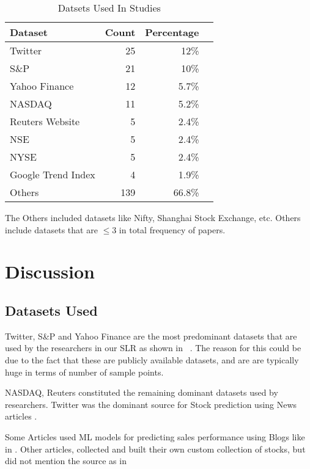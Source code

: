 \documentclass[11pt]{article}
\begin{document}
\begin{table}
\caption{Datsets Used In Studies}
\label{T:datasetsused}
\begin{tabularx}{\columnwidth}{X r r r}
\toprule
Dataset  & Count & Percentage \\
\midrule
Twitter & 25 & 12\% \\
S\&P  & 21 & 10\% \\
Yahoo Finance & 12 & 5.7\% \\
NASDAQ & 11 & 5.2\%\\
Reuters Website & 5 & 2.4\% \\
NSE & 5 & 2.4\%\\
NYSE & 5 & 2.4\% \\
Google Trend Index & 4 & 1.9\%\\
Others & 139 & 66.8\% \\

\midrule
\end{tabularx}
\end{table}

The Others included datasets like Nifty, Shanghai Stock Exchange, etc. Others include datasets that are $\le 3$ in total frequency of papers.

\section{Discussion} \label{S:discussion}

\subsection{Datasets Used} \label{S:datasets used}

Twitter, S\&P and Yahoo Finance are the most predominant datasets that are used by the researchers in our SLR as shown in ~. The reason for this could be due to the fact that these are publicly available datasets, and are are typically huge in terms of number of sample points. 

NASDAQ, Reuters constituted the remaining dominant datasets used by researchers. Twitter was the dominant source for Stock prediction using News articles \citep[see][]{Dong2020,Bollen2011,Sharma2019}.

Some Articles used ML models for predicting sales performance using Blogs like in \cite{Liu2007}. Other articles, collected and built their own custom collection of stocks, but did not mention the source as in \cite{Song2020}
\end{document}
